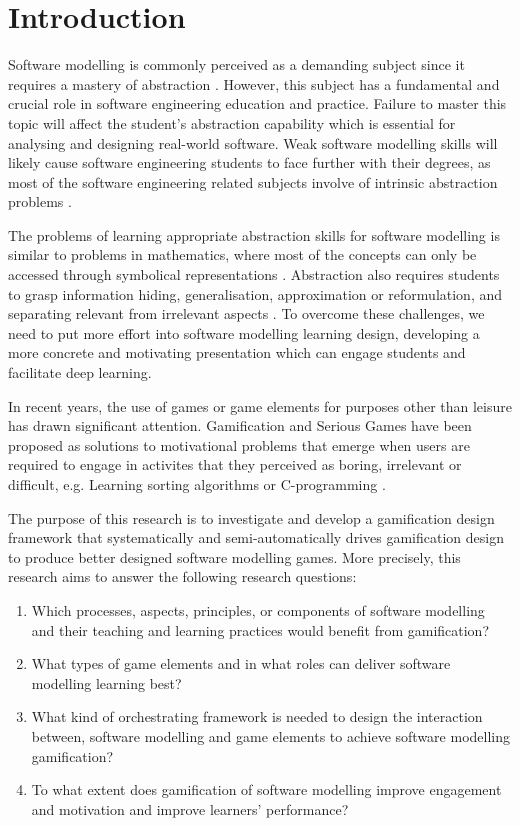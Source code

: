 \documentclass[runningheads,a4paper]{llncs}
\begin{document}
\section{Introduction}
Software modelling is commonly perceived as a demanding subject since it requires a mastery of abstraction \cite{Borstler2012}. However, this subject has a fundamental and crucial role in software engineering education and practice. Failure to master this topic will affect the student’s abstraction capability which is essential for analysing and designing real-world software. Weak software modelling skills will likely cause software engineering students to face further with their degrees, as most of the software engineering related subjects involve of intrinsic abstraction problems \cite{Kramer2007}. 

The problems of learning appropriate abstraction skills for software modelling is similar to problems in mathematics, where most of the concepts can only be accessed through symbolical representations \cite{Duval2006}. Abstraction also requires students to grasp information hiding, generalisation, approximation or reformulation, and separating relevant from irrelevant aspects \cite{Saitta2013}. To overcome these challenges, we need to put more effort into software modelling learning design, developing a more concrete and motivating presentation which can engage students and facilitate deep learning.

In recent years, the use of games or game elements for purposes other than leisure has drawn significant attention. Gamification \cite{deterding2011game} and Serious Games \cite{Michael2005} have been proposed as solutions to motivational problems that emerge when users are required to engage in activites that they perceived as boring, irrelevant or difficult, e.g. Learning sorting algorithms \cite{Yohannis2015} or C-programming \cite{Ibanez2014}.

The purpose of this research is to investigate and develop a gamification design framework that systematically and semi-automatically drives gamification design to produce better designed software modelling games. More precisely, this research aims to answer the following research questions:
\begin{enumerate}
\item Which processes, aspects, principles, or components of software modelling and their teaching and learning practices would benefit from gamification?
\item What types of game elements and in what roles can deliver software modelling learning best? 
\item What kind of orchestrating framework is needed to design the interaction between, software modelling and game elements to achieve software modelling gamification?
\item To what extent does gamification of software modelling improve engagement and motivation and improve learners’ performance?
\end{enumerate}
\end{document}
